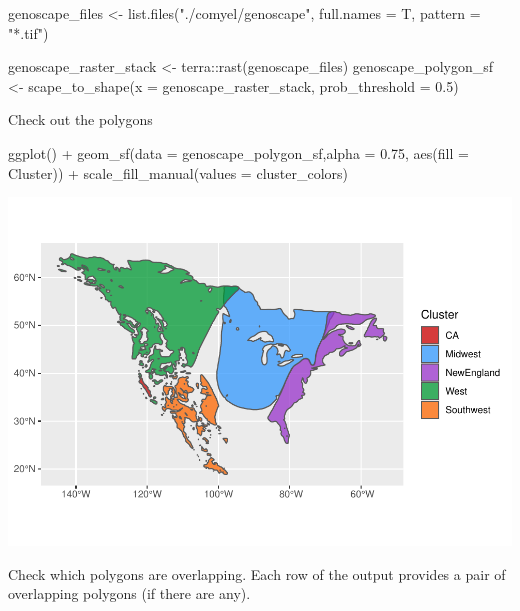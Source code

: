 \documentclass[
]{book}
\newenvironment{Shaded}{\begin{snugshade}}{\end{snugshade}}
\newcommand{\AttributeTok}[1]{\textcolor[rgb]{0.77,0.63,0.00}{#1}}
\newcommand{\FloatTok}[1]{\textcolor[rgb]{0.00,0.00,0.81}{#1}}
\newcommand{\FunctionTok}[1]{\textcolor[rgb]{0.00,0.00,0.00}{#1}}
\newcommand{\NormalTok}[1]{#1}
\newcommand{\OtherTok}[1]{\textcolor[rgb]{0.56,0.35,0.01}{#1}}
\newcommand{\SpecialCharTok}[1]{\textcolor[rgb]{0.00,0.00,0.00}{#1}}
\newcommand{\StringTok}[1]{\textcolor[rgb]{0.31,0.60,0.02}{#1}}
\begin{document}
\begin{Shaded}
\begin{Highlighting}[]
\NormalTok{genoscape\_files }\OtherTok{\textless{}{-}} \FunctionTok{list.files}\NormalTok{(}\StringTok{"./comyel/genoscape"}\NormalTok{, }
                                     \AttributeTok{full.names =}\NormalTok{ T,}
                                     \AttributeTok{pattern =} \StringTok{"*.tif"}\NormalTok{)}

\NormalTok{genoscape\_raster\_stack }\OtherTok{\textless{}{-}}\NormalTok{ terra}\SpecialCharTok{::}\FunctionTok{rast}\NormalTok{(genoscape\_files)}
\NormalTok{genoscape\_polygon\_sf }\OtherTok{\textless{}{-}} \FunctionTok{scape\_to\_shape}\NormalTok{(}\AttributeTok{x =}\NormalTok{ genoscape\_raster\_stack, }\AttributeTok{prob\_threshold =} \FloatTok{0.5}\NormalTok{)}
\end{Highlighting}
\end{Shaded}

Check out the polygons

\begin{Shaded}
\begin{Highlighting}[]
\FunctionTok{ggplot}\NormalTok{() }\SpecialCharTok{+}
  \FunctionTok{geom\_sf}\NormalTok{(}\AttributeTok{data =}\NormalTok{ genoscape\_polygon\_sf,}\AttributeTok{alpha =} \FloatTok{0.75}\NormalTok{, }\FunctionTok{aes}\NormalTok{(}\AttributeTok{fill =}\NormalTok{ Cluster)) }\SpecialCharTok{+}
  \FunctionTok{scale\_fill\_manual}\NormalTok{(}\AttributeTok{values =}\NormalTok{ cluster\_colors)}
\end{Highlighting}
\end{Shaded}

\includegraphics[width=0.7\linewidth]{Mignette_files/figure-latex/unnamed-chunk-3-1}

Check which polygons are overlapping. Each row of the output provides a pair of overlapping polygons (if there are any).
\end{document}
